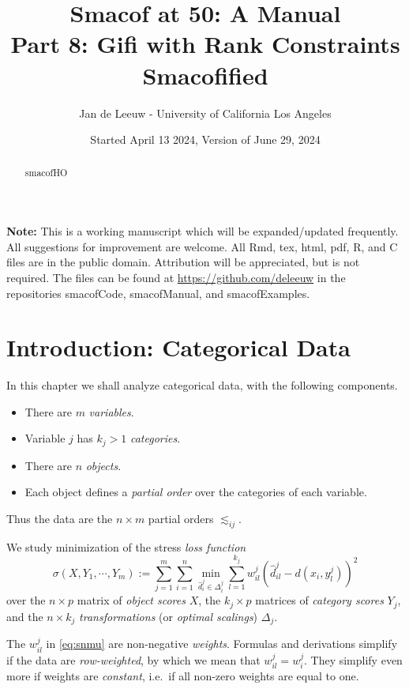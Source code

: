 \documentclass[
  12pt,
]{article}
\title{Smacof at 50: A Manual\\
Part 8: Gifi with Rank Constraints Smacofified}
\author{Jan de Leeuw - University of California Los Angeles}
\date{Started April 13 2024, Version of June 29, 2024}
\providecommand{\tightlist}{%
  \setlength{\itemsep}{0pt}\setlength{\parskip}{0pt}}
\begin{document}
\maketitle
\begin{abstract}
smacofHO
\end{abstract}

{
\setcounter{tocdepth}{3}
\tableofcontents
}
\textbf{Note:} This is a working manuscript which will be expanded/updated
frequently. All suggestions for improvement are welcome. All Rmd, tex,
html, pdf, R, and C files are in the public domain. Attribution will be
appreciated, but is not required. The files can be found at
\url{https://github.com/deleeuw} in the repositories smacofCode, smacofManual,
and smacofExamples.

\section{Introduction: Categorical Data}\label{introduction-categorical-data}

In this chapter we shall analyze categorical data, with the following components.

\begin{itemize}
\tightlist
\item
  There are \(m\) \emph{variables}.
\item
  Variable \(j\) has \(k_j>1\) \emph{categories}.
\item
  There are \(n\) \emph{objects}.
\item
  Each object defines a \emph{partial order} over the categories of each variable.
\end{itemize}

Thus the data are the \(n\times m\) partial orders \(\lesssim_{ij}\).

We study minimization of the stress \emph{loss function}
\begin{equation}
\sigma(X,Y_1,\cdots,Y_m):=\sum_{j=1}^m\sum_{i=1}^n\min_{\hat d_i^j\in\Delta_i^j}\sum_{l=1}^{k_j}w_{il}^j(\hat d_{il}^j-d(x_i,y_l^j))^2
\label{eq:snmu}
\end{equation}
over the \(n\times p\) matrix of \emph{object scores} \(X\), the \(k_j\times p\)
matrices of \emph{category scores} \(Y_j\), and the \(n\times k_j\) \emph{transformations} (or \emph{optimal scalings}) \(\Delta_j\).

The \(w_{il}^j\) in \eqref{eq:snmu}
are non-negative \emph{weights}. Formulas and derivations simplify if the data are \emph{row-weighted}, by which we mean that \(w_{il}^j=w_i^j\). They simplify
even more if weights are \emph{constant}, i.e.~if all non-zero weights
are equal to one.
\end{document}
